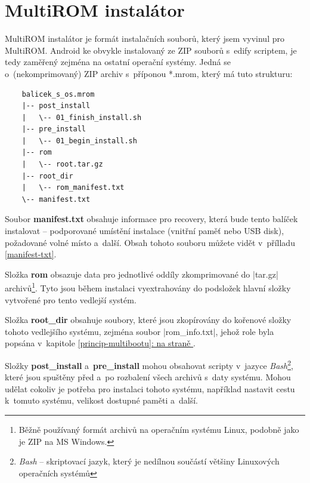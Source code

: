 \documentclass[12pt, a4paper, oneside]{article}
\newcommand{\B}{\textbf} %
\newcommand{\It}{\textit}  %
\newcommand*{\fullref}[1]{\hyperref[{#1}]{\ref*{#1}: \uv{\nameref*{#1}} na straně \pageref{#1}}}
\begin{document}
\section*{MultiROM instalátor}
\label{sec:installer}
MultiROM instalátor je formát instalačních souborů, který jsem vyvinul pro MultiROM. Android ke obvykle instalovaný ze ZIP souborů s~edify scriptem, je tedy zaměřený zejména na ostatní operační systémy. Jedná se o~(nekomprimovaný) ZIP archiv s~příponou *.mrom, který má tuto strukturu:
\begin{verbatim}
    balicek_s_os.mrom
    |-- post_install
    |   \-- 01_finish_install.sh
    |-- pre_install
    |   \-- 01_begin_install.sh
    |-- rom
    |   \-- root.tar.gz
    |-- root_dir
    |   \-- rom_manifest.txt
    \-- manifest.txt
\end{verbatim}

Soubor \B{manifest.txt} obsahuje informace pro recovery, která bude tento balíček instalovat -- podporované umístění instalace (vnitřní paměť nebo USB disk), požadované volné místo a~další. Obsah tohoto souboru můžete vidět v~přílladu \ref{manifest-txt}.

Složka \B{rom} obsazuje data pro jednotlivé oddíly zkomprimované do |tar.gz| archivů\footnote{Běžně používaný formát archivů na operačním systému Linux, podobně jako je ZIP na MS Windows.}. Tyto jsou během instalaci vyextrahovány do podsložek hlavní složky vytvořené pro tento vedlejší systém.

Složka \B{root\_dir} obsahuje soubory, které jsou zkopírovány do kořenové složky tohoto vedlejšího systému, zejména soubor |rom_info.txt|, jehož role byla popsána v~kapitole \fullref{princip-multibootu}.

Složky \B{post\_install} a~\B{pre\_install} mohou obsahovat scripty v~jazyce \It{Bash}\footnote{\It{Bash} -- skriptovací jazyk, který je nedílnou součástí většiny Linuxových operačních systémů}, které jsou spuštěny před a~po rozbalení všech archivů s~daty systému. Mohou udělat cokoliv je potřeba pro instalaci tohoto systému, například nastavit cestu k~tomuto systému, velikost dostupné paměti a~další.
\end{document}
